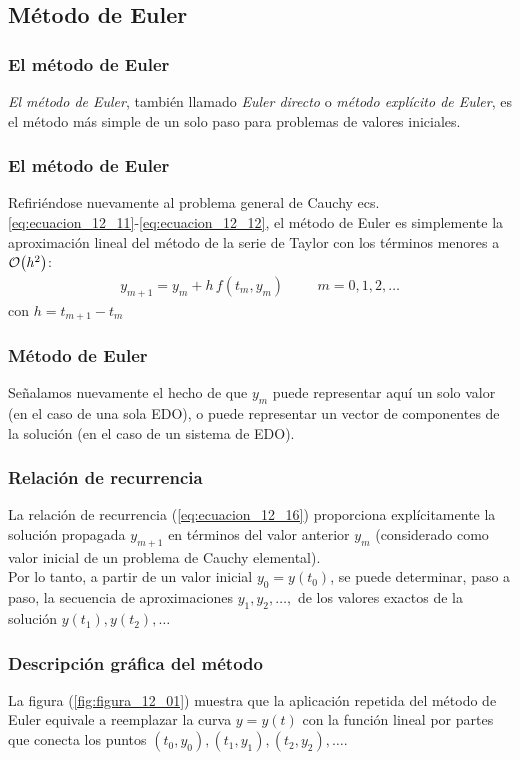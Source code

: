 \subsection{Método de Euler}
\begin{frame}
\frametitle{El método de Euler}
\emph{El método de Euler}, también llamado \emph{Euler directo} o \emph{método explícito de Euler}, es el método más simple de un solo paso para problemas de valores iniciales.
\end{frame}
\begin{frame}
\frametitle{El método de Euler}
Refiriéndose nuevamente al problema general de Cauchy ecs. \ref{eq:ecuacion_12_11}-\ref{eq:ecuacion_12_12}, el método de Euler es simplemente la aproximación lineal del método de la serie de Taylor con los términos menores a $\order{h^{2}}$:
\begin{align}
y_{m+1} =  y_{m} +  h \, f(t_{m}, y_{m}) \hspace{1cm} m = 0, 1, 2, \ldots
\label{eq:ecuacion_12_16}
\end{align}
con $h = t_{m+1} - t_{m}$
\end{frame}
\begin{frame}
\frametitle{Método de Euler}
Señalamos nuevamente el hecho de que $y_{m}$ puede representar aquí un solo valor (en el caso de una sola EDO), o puede representar un vector de componentes de la solución (en el caso de un sistema de EDO).
\end{frame}
\begin{frame}
\frametitle{Relación de recurrencia}
La relación de recurrencia (\ref{eq:ecuacion_12_16}) proporciona explícitamente la solución propagada $y_{m + 1}$ en términos del valor anterior $y_{m}$ (considerado como valor inicial de un problema de Cauchy elemental).
\\
\bigskip
Por lo tanto, a partir de un valor inicial $y_{0} = y(t_{0})$, se puede determinar, paso a paso, la secuencia de aproximaciones $y_{1}, y_{2}, \ldots,$ de los valores exactos de la solución $y(t_{1}), y(t_{2}), \ldots$
\end{frame}
\begin{frame}
\frametitle{Descripción gráfica del método}
La figura (\ref{fig:figura_12_01}) muestra que la aplicación repetida del método de Euler equivale a reemplazar la curva $y = y (t)$ con la función lineal por partes que conecta los puntos $(t_{0}, y_{0}), (t_{1}, y_{1}), (t_{2}, y_{2}), \ldots$.
\end{frame}

